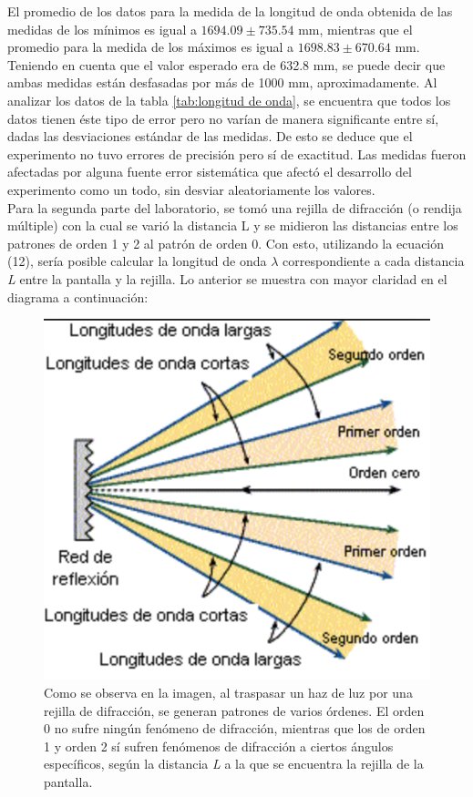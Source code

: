 \documentclass[%
 reprint,
 amsmath,amssymb,
 aps,
]{revtex4-1}
\begin{document}
El promedio de los datos para la medida de la longitud de onda obtenida de las medidas de los mínimos es igual a $1694.09 \pm 735.54$ mm, mientras que el promedio para la medida de los máximos es igual a $1698.83 \pm 670.64$ mm. Teniendo en cuenta que el valor esperado era de 632.8 mm, se puede decir que ambas medidas están desfasadas por más de 1000 mm, aproximadamente. Al analizar los datos de la tabla \ref{tab:longitud de onda}, se encuentra que todos los datos tienen éste tipo de error pero no varían de manera significante entre sí, dadas las desviaciones estándar de las medidas. De esto se deduce que el experimento no tuvo errores de precisión pero sí de exactitud. Las medidas fueron afectadas por alguna fuente error sistemática que afectó el desarrollo del experimento como un todo, sin desviar aleatoriamente los valores. \\
Para la segunda parte del laboratorio, se tomó una rejilla de difracción (o rendija múltiple) con la cual se varió la distancia L y se midieron las distancias entre los patrones de orden 1 y 2 al patrón de orden 0. Con esto, utilizando la ecuación (12), sería posible calcular la longitud de onda $\lambda$ correspondiente a cada distancia \textit{L} entre la pantalla y la rejilla. Lo anterior se muestra con mayor claridad en el diagrama a continuación: 

\begin{figure}[H]
    \centering
    \includegraphics[scale= 0.5]{laseradventure.png}
    \caption{Como se observa en la imagen, al traspasar un haz de luz por una rejilla de difracción, se generan patrones de varios órdenes. El orden 0 no sufre ningún fenómeno de difracción, mientras que los de orden 1 y orden 2 sí sufren fenómenos de difracción a ciertos ángulos específicos, según la distancia \textit{L} a la que se encuentra la rejilla de la pantalla.}
    \label{fig:maximos}
\end{figure}
\end{document}
